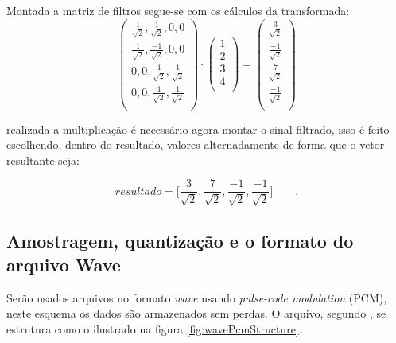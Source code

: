 \begin{myenv}{1.5}
			\par Montada a matriz de filtros segue-se com os cálculos da transformada:
			\begin{equation}
				\begin{pmatrix}
					\frac{1}{\sqrt{2}}, \frac{1}{\sqrt{2}}, 0, 0\\
					\frac{1}{\sqrt{2}}, \frac{-1}{\sqrt{2}}, 0, 0\\
					0, 0, \frac{1}{\sqrt{2}}, \frac{1}{\sqrt{2}}\\
					0, 0, \frac{1}{\sqrt{2}}, \frac{1}{\sqrt{2}}\\
				\end{pmatrix} 
				\cdot
				\begin{pmatrix}
					1\\
					2\\
					3\\
					4\\
				\end{pmatrix} 
				=
				\begin{pmatrix}
					\frac{3}{\sqrt{2}}\\
					\frac{-1}{\sqrt{2}}\\
					\frac{7}{\sqrt{2}}\\
					\frac{-1}{\sqrt{2}}\\
				\end{pmatrix}
			\end{equation}
			
			\par realizada a multiplicação é necessário agora montar o sinal filtrado, isso é feito escolhendo, dentro do resultado, valores alternadamente de forma que o vetor resultante seja:

			\begin{equation}
				resultado = \Big[
				\frac{3}{\sqrt{2}},
				\frac{7}{\sqrt{2}},
				\frac{-1}{\sqrt{2}},
				\frac{-1}{\sqrt{2}}
				\Big]\qquad.
			\end{equation}
		
			\subsection{Amostragem, quantização e o formato do arquivo Wave}
				\par Serão usados arquivos no formato \textit{wave} usando \textit{pulse-code modulation} (PCM), neste esquema os dados são armazenados sem perdas. O arquivo, segundo \cite{WAVE2019}, se estrutura como o ilustrado na figura \ref{fig:wavePcmStructure}.
				

\end{myenv}
